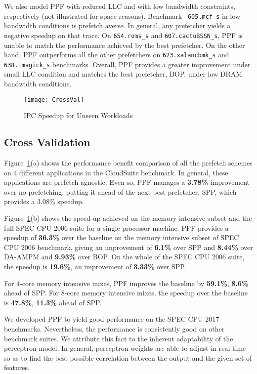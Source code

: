 We also model PPF with reduced LLC and with low bandwidth constraints,
respectively (not illustrated for space reasons).  Benchmark {\tt
  605.mcf\_s} in low bandwidth conditions is prefetch averse. In
general, any prefetcher yields a negative speedup on that trace. On
{\tt 654.roms\_s} and {\tt 607.cactuBSSN\_s}, PPF is unable to match
the performance achieved by the best prefetcher. On the other hand,
PPF outperforms all the other prefetchers on {\tt 623.xalancbmk\_s}
and {\tt 638.imagick\_s} benchmarks.  Overall, PPF provides a greater
improvement under small LLC condition and matches the best prefetcher,
BOP, under low DRAM bandwidth conditions.

\begin{figure}[ht]
\begin{adjustwidth}{-0.4cm}{}
\texttt{[image: CrossVal]}
\caption{IPC Speedup for Unseen Workloads}
\label{Fig:CrossVal}
\end{adjustwidth}
\end{figure}

\subsection{Cross Validation}
\label{Results-CrossVal}

Figure~\ref{Fig:CrossVal}(a) shows the performance benefit comparison
of all the prefetch schemes on 4 different applications in the
CloudSuite benchmark.  In general, these applications are prefetch
agnostic.  Even so, PPF manages a \textbf{3.78\%} improvement over no
prefetching, putting it ahead of the next best prefetcher, SPP, which
provides a 3.08\% speedup.

Figure~\ref{Fig:CrossVal}(b) shows the speed-up achieved on the memory
intensive subset and the full SPEC CPU 2006 suite for a
single-processor machine.  PPF provides a speedup of \textbf{36.3\%}
over the baseline on the memory intensive subset of SPEC CPU 2006
benchmark, giving an improvement of \textbf{6.1\%} over SPP and
\textbf{8.44\%} over DA-AMPM and \textbf{9.93\%} over BOP. On the whole
of the SPEC CPU 2006 suite, the speedup is \textbf{19.6\%}, an
improvement of \textbf{3.33\%} over SPP.

For 4-core memory intensive mixes, PPF improves the baseline by
\textbf{59.1\%}, \textbf{8.6\%} ahead of SPP. For 8-core memory
intensive mixes, the speedup over the baseline is \textbf{47.8\%},
\textbf{11.3\%} ahead of SPP.

We developed PPF to yield good performance on the SPEC CPU 2017
benchmarks.  Nevertheless, the performance is consistently good on
other benchmark suites.  We attribute this fact to the inherent
adaptability of the perceptron model.  In general, perceptron weights
are able to adjust in real-time so as to find the best possible
correlation between the output and the given set of features.
